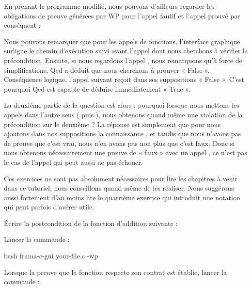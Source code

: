 En prenant le programme modifié, nous pouvons d'ailleurs regarder les obligations
de preuve générées par WP pour l'appel fautif et l'appel prouvé par conséquent :







Nous pouvons remarquer que pour les appels de fonctions, l'interface graphique
surligne le chemin d'exécution suivi avant l'appel dont nous cherchons à
vérifier la précondition. Ensuite, si nous regardons l'appel ,
nous remarquons qu'à force de simplifications, Qed a déduit que nous
cherchons à prouver « False ». Conséquence logique, l'appel suivant 
reçoit dans ses suppositions « False ». C'est pourquoi Qed est capable de déduire
immédiatement « True ».



La deuxième partie de la question est alors : pourquoi lorsque nous mettons les
appels dans l'autre sens ( puis ), nous obtenons
quand même une violation de la précondition sur le deuxième ? La réponse est
simplement que pour  nous ajoutons dans nos suppositions la
connaissance , et tandis que nous n'avons pas de preuve
que c'est vrai, nous n'en avons pas non plus que c'est faux. Donc si nous obtenons
nécessairement une preuve de « faux » avec un appel , ce n'est
pas le cas de l'appel  qui peut aussi ne pas échouer.




Ces exercices ne sont pas absolument nécessaires pour lire les chapitres à
venir dans ce tutoriel, nous conseillons quand même de les réaliser. Nous
suggérons aussi fortement d'au moins lire le quatrième exercice qui introduit
une notation qui peut parfois d'avérer utile.




Écrire la postcondition de la fonction d'addition suivante :




Lancer la commande :

\begin{CodeBlock}{bash}
frama-c-gui your-file.c -wp
\end{CodeBlock}


Lorsque la preuve que la fonction respecte son contrat est établie, lancer
la commande :

